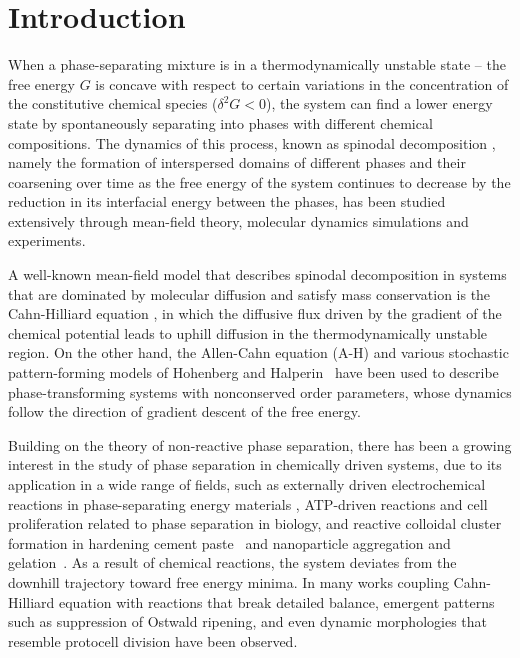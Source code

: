 \documentclass[reprint,aps,pre,superscriptaddress]{revtex4-2}
\begin{document}
\maketitle

\section{Introduction} \label{sec::intro}
When a phase-separating mixture is in a thermodynamically unstable state -- the free energy $G$ is concave with respect to certain variations in the concentration of the constitutive chemical species ($\delta^2 G<0$), the system can find a lower energy state by spontaneously separating into phases with different chemical compositions.
The dynamics of this process, known as spinodal decomposition \cite{Cahn1961,Bray2002}, namely the formation of interspersed domains of different phases and their coarsening over time as the free energy of the system continues to decrease by the reduction in its interfacial energy between the phases, has been studied extensively through mean-field theory\cite{Lifshitz1961,Siggia1979,Bray2002,Binder1987,Valls1993,Furukawa2000,Koga1991}, molecular dynamics simulations\cite{Velasco1996,Velasco1993,Laradji1996} and experiments\cite{Nishi1975,Huang1974,Hashimoto1988}.

A well-known mean-field model that describes spinodal decomposition in systems that are dominated by molecular diffusion and satisfy mass conservation is the Cahn-Hilliard equation \cite{CahnJohnE.1958}, in which the diffusive flux driven by the gradient of the chemical potential leads to uphill diffusion in the thermodynamically unstable region. On the other hand, the Allen-Cahn equation (A-H) \cite{Kardar2007,Allen1972} and various stochastic pattern-forming models of Hohenberg and Halperin~\cite{hohenberg1977theory} have been used to describe phase-transforming systems with nonconserved order parameters, whose dynamics follow the direction of gradient descent of the free energy. 

Building on the theory of non-reactive phase separation, there has been a growing interest in the study of phase separation in chemically driven systems, due to its application in a wide range of fields, such as externally driven electrochemical reactions in phase-separating energy materials \cite{Bazant2013,Bazant2017,Bai2011,Lim2016}, ATP-driven reactions and cell proliferation related to phase separation in biology\cite{Zwicker2015,Zwicker2017,Berry2018,Zwicker2022,Cates2010}, and reactive colloidal cluster formation in hardening cement paste~\cite{petersen2018phase,ioannidou2016mesoscale} and nanoparticle aggregation and gelation~\cite{weitz1984fractal,zaccarelli2008gelation}.
As a result of chemical reactions, the system deviates from the downhill trajectory toward free energy minima. In many works coupling Cahn-Hilliard equation with reactions that break detailed balance, emergent patterns such as suppression of Ostwald ripening, and even dynamic morphologies that resemble protocell division\cite{Glotzer1995,Cates2010,Zwicker2015,Zwicker2017} have been observed.
\end{document}
